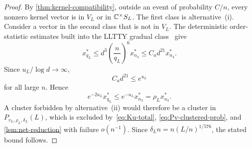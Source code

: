 \begin{proof}
By 
\cref{thm:kernel-compatibility}, outside an event of probability $C/n$, every nonzero kernel vector is in $V_L$ or in $\mathbb C^{\times}S_L$. The first class is alternative~(i). Consider a vector in the second class that is not in $V_L$. The deterministic order-statistic estimates built into the LLTTY gradual class~\cite[Lemma~4.2]{LLTTY19} give
\begin{equation}\label{eq:qL-n3-order-stat}
  x_{q_L}^*
  \le d^3\left(\frac n{q_L}\right)^6x_{n_3}^*
  \le C_ad^{21}x_{n_3}^*.
\end{equation}
Since $u_L/\log d\to\infty$,
\[
  C_ad^{21}\le e^{u_L}
\]
for all large $n$. Hence
\begin{equation}\label{eq:radius-comparison}
  e^{-2u_L}x_{q_L}^*
  \le e^{-u_L}x_{n_3}^*
  =\rho_Lx_{n_3}^*.
\end{equation}
A cluster forbidden by alternative~(ii) would therefore be a cluster in $P_{v_L,\rho_L,\delta_L}(L)$, which is excluded by~\eqref{eq:Ku-total}, \eqref{eq:Pv-clustered-prob}, and 
\cref{lem:net-reduction} with failure $o(n^{-1})$. Since $\delta_Ln=n(L/n)^{1/576}$, the stated bound follows.
\end{proof}
